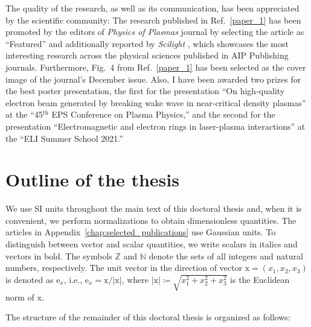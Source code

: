 \documentclass[10pt, a4paper, twoside, openright]{report}
\newcommand{\q}[1]{``#1''} %
\newcommand{\norm}[1]{|#1|}
\renewcommand{\vec}[1]{\boldsymbol{\mathrm{#1}}}
\begin{document}
The quality of the research, as well as its communication, has been appreciated by the scientific community: The research published in Ref.~\ref{paper_1} has been promoted by the editors of \textit{Physics of Plasmas} journal by selecting the article as \q{Featured} and additionally reported by \textit{Scilight} \cite{Patrick2021}, which showcases the most interesting research across the physical sciences published in AIP Publishing journals. Furthermore, Fig.~4 from Ref.~\ref{paper_1} has been selected as the cover image of the journal's December issue. Also, I have been awarded two prizes for the best poster presentation, the first for the presentation \q{On high-quality electron beam generated by breaking wake wave in near-critical density plasmas} at the \q{45$ ^{\mathrm{th}} $ EPS Conference on Plasma Physics,} and the second for the presentation \q{Electromagnetic and electron rings in laser-plasma interactions} at the \q{ELI Summer School 2021.} 

\section{Outline of the thesis}
%

We use SI units throughout the main text of this doctoral thesis and, when it is convenient, we perform normalizations to obtain dimensionless quantities. The articles in Appendix~\ref{chap:selected_publications} use Gaussian units. To distinguish between vector and scalar quantities, we write scalars in italics and vectors in bold. The symbols $ \mathbb{Z} $ and $ \mathbb{N} $ denote the sets of all integers and natural numbers, respectively. The unit vector in the direction of vector $ \vec{x} = \left( x_1, x_2, x_3 \right) $ is denoted as $ \vec{e}_{x} $, i.e., $ \vec{e}_{x} = \vec{x} / \norm{\vec{x}} $, where $ \norm{\vec{x}} \coloneq \sqrt{x_1^2 + x_2^2 + x_3^2} $ is the Euclidean norm of $ \vec{x} $. 

The structure of the remainder of this doctoral thesis is organized as follows:
\end{document}
